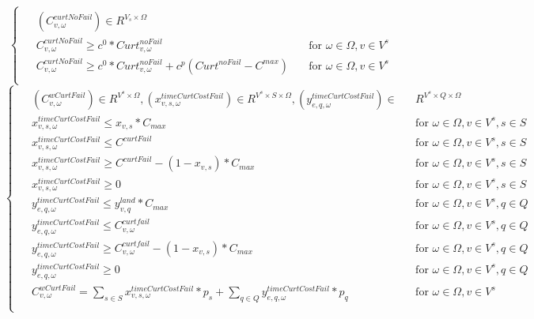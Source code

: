 \documentclass[a4paper,12pt]{article}
\begin{document}
\begin {enumerate}
{\begin{equation}
\begin{cases}
\begin{alignedat}{2}
                & (C_{v,\omega}^{curtNoFail}) \in R^{V_{s} \times \Omega} \\
                & C_{v,\omega}^{curtNoFail} \geq c^{0}*Curt_{v,\omega}^{noFail} & \quad  \text{for } \omega \in\Omega, v \in V^{s} \\
                & C_{v,\omega}^{curtNoFail} \geq c^{0}*Curt_{v,\omega}^{noFail} + c^{p}(Curt^{noFail}-C^{max}) & \quad  \text{for } \omega \in\Omega, v \in V^{s} \\
            \end{alignedat}
        \end{cases}
    \end{equation}
    \begin{equation}
        \begin{cases}
            \begin{alignedat}{2}
                & (C_{v,\omega}^{wCurtFail}) \in R^{V^{s} \times \Omega}, (x_{v,s,\omega}^{timeCurtCostFail}) \in R^{V^{s} \times S \times \Omega},(y_{e,q, \omega}^{timeCurtCostFail}) \in && R^{V^{s} \times Q \times \Omega} \\
                & x_{v,s,\omega}^{timeCurtCostFail} \leq x_{v,s} * C_{max} && \text{for } \omega \in\Omega, v \in V^{s}, s \in S\\
                & x_{v,s,\omega}^{timeCurtCostFail} \leq C^{curtFail} && \text{for } \omega \in\Omega, v \in V^{s}, s \in S \\
                & x_{v,s,\omega}^{timeCurtCostFail} \geq C^{curtFail} - (1 - x_{v,s})*C_{max} && \text{for } \omega \in\Omega, v \in V^{s}, s \in S\\
                & x_{v,s,\omega}^{timeCurtCostFail} \geq 0 && \text{for } \omega \in\Omega, v \in V^{s}, s \in S\\
                & y_{e,q,\omega}^{timeCurtCostFail} \leq y_{v,q}^{land}*C_{max} && \text{for } \omega \in\Omega, v \in V^{s}, q \in Q\\
                & y_{e,q,\omega}^{timeCurtCostFail} \leq C_{v,\omega}^{curtfail} && \text{for } \omega \in\Omega, v \in V^{s}, q \in Q\\
                & y_{e,q,\omega}^{timeCurtCostFail} \geq C_{v,\omega}^{curtfail} - (1 - x_{v,s})*C_{max} && \text{for } \omega \in\Omega, v \in V^{s}, q \in Q\\
                & y_{e,q,\omega}^{timeCurtCostFail} \geq 0 && \text{for } \omega \in\Omega, v \in V^{s}, q \in Q\\
                & C_{v,\omega}^{wCurtFail} = \sum_{s \in S} x_{v,s, \omega}^{timeCurtCostFail}*p_{s} + \sum_{q \in Q} y_{e,q,\omega}^{timeCurtCostFail} * p_{q} && \text{for } \omega \in\Omega, v \in V^{s}\\

\end{alignedat}
\end{cases}
\end{equation}}
\end{enumerate}
\end{document}
